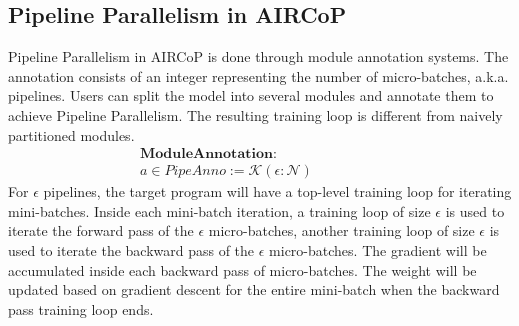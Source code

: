 \documentclass[sigplan, nonacm]{acmart}\settopmatter{printfolios=true,printccs=false,printacmref=false}
\begin{document}
 \subsection{Pipeline Parallelism in AIRCoP}
 Pipeline Parallelism in AIRCoP is done through module annotation systems. The annotation consists of an integer representing the number of micro-batches, a.k.a. pipelines.
 Users can split the model into several modules and annotate them to achieve Pipeline Parallelism. The resulting training loop is different from naively partitioned modules.
 \begin{align*}
  \textbf{ModuleAnnotation}: \qquad \qquad& \\
  a \in PipeAnno  := \mathcal{K} (\epsilon : \mathcal{N})\qquad \qquad&
\end{align*}
For $\epsilon$ pipelines, the target program will have a top-level training loop for iterating mini-batches. Inside each mini-batch iteration, a training loop of size $\epsilon$ is used to iterate the forward pass of the $\epsilon$ micro-batches, another training loop of size $\epsilon$ is used to iterate the backward pass of the $\epsilon$ micro-batches. The gradient will be accumulated inside each backward pass of micro-batches. The weight will be updated based on gradient descent for the entire mini-batch when the backward pass training loop ends.
\end{document}
